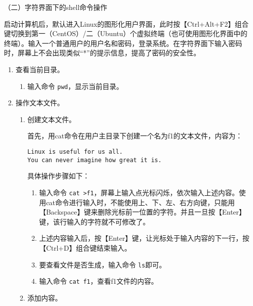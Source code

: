\vspace{0.1in}
（二）字符界面下的shell命令操作

启动计算机后，默认进入Linux的图形化用户界面，此时按【Ctrl+Alt+F2】组合键切换到第一（CentOS）/二（Ubuntu）个虚拟终端（也可使用图形化界面中的终端）。输入一个普通用户的用户名和密码，登录系统。在字符界面下输入密码时，屏幕上不会出现类似“*”的提示信息，提高了密码的安全性。
\begin{enumerate}
  \item 查看当前目录。
    \begin{enumerate}
      \item 输入命令 \verb|pwd|，显示当前目录。
    \end{enumerate}
  \item 操作文本文件。
    \begin{enumerate}
      \item 创建文本文件。 

首先，用cat命令在用户主目录下创建一个名为f1的文本文件，内容为：
\begin{verbatim}
Linux is useful for us all.
You can never imagine how great it is.
\end{verbatim}
具体操作步骤如下：
    \begin{enumerate}
      \item 输入命令 \verb|cat >f1|，屏幕上输入点光标闪烁，依次输入上述内容。使用cat命令进行输入时，不能使用上、下、左、右方向键，只能用【Backspace】键来删除光标前一位置的字符。并且一旦按【Enter】键，该行输入的字符就不可修改了。
      \item 上述内容输入后，按【Enter】键，让光标处于输入内容的下一行，按【Ctrl+D】组合键结束输入。
      \item 要查看文件是否生成，输入命令 \verb|ls|即可。
      \item 输入命令 \verb|cat f1|，查看f1文件的内容。
    \end{enumerate}
  \item 添加内容。


\end{enumerate}
\end{enumerate}
